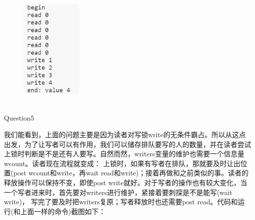 \documentclass[12pt]{article}
\begin{document}
\begin{figure}[h]
    \centering
    \includegraphics[width=3cm,height=6cm]{hw9-9.jpg}
\end{figure}
\newpage
\begin{large}
    \noindent Question5\par
\end{large}
我们能看到，上面的问题主要是因为读者对写锁write的无条件霸占。所以从这点出发，为了让写者可以有作用，我们可以储存排队要写的人的数量，并在读者尝试上锁时判断是不是还有人要写。自然而然，writers变量的维护也需要一个信息量wcount。读者现在流程就变成：
上锁时，如果有写者在排队，那就要及时让出位置(post wcount和write，再wait read和write)；接着再做和之前类似的事。读者的释放操作可以保持不变，即使post write就好。对于写者的操作也有较大变化，当一个写者进来时，首先要对writers进行维护，紧接着要刺探是不是能写(wait write)，
写完了要及时把writers复原；写者释放时也还需要post read。代码和运行(和上面一样的命令)截图如下：
\begin{figure}[!h]
    \centering
    \hfill
\end{figure}
\end{document}
